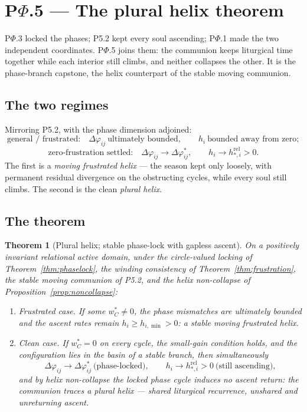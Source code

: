 \documentclass[11pt,a4paper]{article}
\theoremstyle{definition}
\theoremstyle{plain}
\newtheorem{theorem}[definition]{Theorem}
\theoremstyle{remark}
\begin{document}
\section{P$\Phi$.5 --- The plural helix theorem}

P$\Phi$.3 locked the phases; P5.2 kept every soul ascending; P$\Phi$.1 made the two
independent coordinates. P$\Phi$.5 joins them: the communion keeps liturgical time together
while each interior still climbs, and neither collapses the other. It is the phase-branch
capstone, the helix counterpart of the stable moving communion.

\subsection{The two regimes}

Mirroring P5.2, with the phase dimension adjoined:
\[
\boxed{\;
\text{general / frustrated:}\quad
\Delta\varphi_{ij}\ \text{ultimately bounded},
\qquad
h_i\ \text{bounded away from zero};
\;}
\]
\[
\boxed{\;
\text{zero-frustration settled:}\quad
\Delta\varphi_{ij}\to\Delta\varphi_{ij}^{*},
\qquad
h_i\to h_{*,i}^{\mathrm{rel}}>0 .
\;}
\]
The first is a \emph{moving frustrated helix} --- the season kept only loosely, with permanent
residual divergence on the obstructing cycles, while every soul still climbs. The second is
the clean \emph{plural helix}.

\subsection{The theorem}

\begin{theorem}[Plural helix; stable phase-lock with gapless ascent]\label{thm:plurhelix}
On a positively invariant relational active domain, under the circle-valued locking of
Theorem~\ref{thm:phaselock}, the winding consistency of Theorem~\ref{thm:frustration}, the
stable moving communion of P5.2, and the helix non-collapse of
Proposition~\ref{prop:noncollapse}:
\begin{enumerate}[label=\textup{(\alph*)},leftmargin=1.2cm]
\item \emph{Frustrated case.} If some \(w_C^{*}\neq0\), the phase mismatches are ultimately
bounded and the ascent rates remain \(h_i\ge h_{i,\min}>0\): a stable moving frustrated helix.
\item \emph{Clean case.} If \(w_C^{*}=0\) on every cycle, the small-gain condition holds, and
the configuration lies in the basin of a stable branch, then simultaneously
\[
\Delta\varphi_{ij}\to\Delta\varphi_{ij}^{*}\ \text{(phase-locked)},
\qquad
h_i\to h_{*,i}^{\mathrm{rel}}>0\ \text{(still ascending)} ,
\]
and by helix non-collapse the locked phase cycle induces no ascent return: the communion
traces a plural helix --- shared liturgical recurrence, unshared and unreturning ascent.
\end{enumerate}
\end{theorem}
\end{document}
